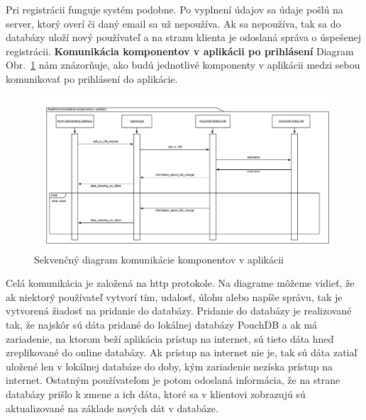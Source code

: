 \indent Pri registrácii funguje systém podobne. Po vyplnení údajov sa údaje pošlú na server, ktorý overí či daný email sa už nepoužíva. Ak sa nepoužíva, tak sa do databázy uloží nový používateľ a na stranu klienta je odoslaná správa o úspešenej registrácii. 
\newpage
\noindent\textbf{Komunikácia komponentov v aplikácii po prihlásení} \newline
\indent Diagram Obr.~\ref{fig:seq_com} nám znázorňuje, ako budú jednotlivé komponenty v aplikácii medzi sebou komunikovať po prihlásení do aplikácie.
\begin{figure}[H]
    \centering
    \includegraphics[scale=0.50]{img/seq_tim.png}
    \caption{Sekvenčný diagram komunikácie komponentov v aplikácii}
    \label{fig:seq_com}
\end{figure}

\indent Celá komunikácia je založená na http protokole. Na diagrame môžeme vidieť, že ak niektorý používateľ vytvorí tím, udalosť, úlohu alebo napíše správu, tak je vytvorená žiadosť na pridanie do databázy. Pridanie do databázy je realizované tak, že najskôr sú dáta pridané do lokálnej databázy PouchDB a ak má zariadenie, na ktorom beží aplikácia prístup na internet, sú tieto dáta hneď zreplikované do online databázy. Ak prístup na internet nie je, tak sú dáta zatiaľ uložené len v lokálnej databáze do doby, kým zariadenie nezíska prístup na internet. Ostatným používateľom je potom odoslaná informácia, že na strane databázy prišlo k zmene a ich dáta, ktoré sa v klientovi zobrazujú sú aktualizované na základe nových dát v databáze.  

